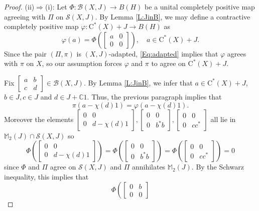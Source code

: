 \documentclass[10pt]{amsart}
\newcommand{\bC}{{\mathbb{C}}}
\newcommand{\bM}{{\mathbb{M}}}
\newcommand{\B}{{\mathcal{B}}}
\renewcommand{\S}{{\mathcal{S}}}
\newcommand{\rC}{\mathrm{C}}
\renewcommand{\phi}{\varphi}
\theoremstyle{definition}
\begin{document}
\begin{proof}
(ii)$\Rightarrow$(i): Let $\Phi:\B(X,J)\to B(H)$ be a unital completely positive map agreeing with $\Pi$ on $\S(X,J)$.
By Lemma \ref{L:JinB}, we may define a contractive completely positive map $\phi:\rC^*(X)+J\to B(H)$ as
\[
\phi(a)=\Phi\left(\begin{bmatrix}
a& 0 \\ 0 & 0
\end{bmatrix}\right), \quad a\in \rC^*(X)+J.
\]
Since the pair $(\Pi,\pi)$ is $(X,J)$-adapted,  \eqref{Eq:adapted} implies that $\phi$ agrees with $\pi$ on $X$, so our assumption forces $\phi$ and $\pi$ to agree on $\rC^*(X)+J$.



 Fix $\begin{bmatrix}
a & b \\ c& d
\end{bmatrix}\in \B(X,J)$. By Lemma \ref{L:JinB}, we infer that $a\in \rC^*(X)+J$, $b\in J,c\in J$ and $d\in J+\bC 1$. Thus, the previous paragraph implies that
\begin{equation}\label{Eq:piphia}
\pi(a-\chi(d)1)=\phi(a-\chi(d)1).
\end{equation}
Moreover the elements
$\begin{bmatrix}
0& 0 \\ 0 & d-\chi(d)1
\end{bmatrix},\begin{bmatrix}
0 & 0 \\ 0 & b^*b
\end{bmatrix},\begin{bmatrix}
0 & 0 \\ 0 & cc^*
\end{bmatrix}$ all lie in $ \bM_2(J)\cap \S(X,J)$
so
\[
\Phi\left(\begin{bmatrix}
0 & 0 \\  0& d-\chi(d)1
\end{bmatrix}\right)=\Phi\left(\begin{bmatrix}
0 & 0 \\ 0 & b^*b
\end{bmatrix} \right)=\Phi\left(\begin{bmatrix}
0 & 0 \\ 0 & cc^*
\end{bmatrix} \right)=0
\]
since  $\Phi$ and $\Pi$ agree on $\S(X,J)$ and $\Pi$  annihilates $\bM_2(J)$.
By the Schwarz inequality, this implies that
\[
\Phi\left(\begin{bmatrix}
0& b \\ 0& 0

\end{bmatrix}\]
\end{proof}
\end{document}
